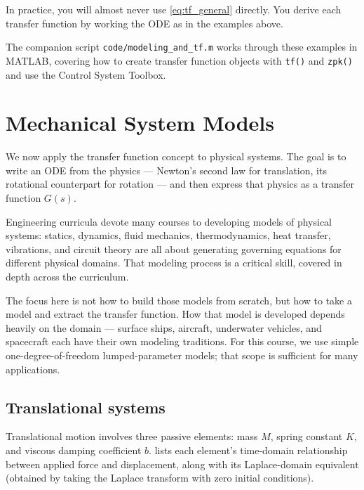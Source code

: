 \documentclass[12pt]{article}
\begin{document}
In practice, you will almost never use \cref{eq:tf_general} directly.  You
derive each transfer function by working the ODE as in the examples above.

The companion script \texttt{code/modeling\_and\_tf.m} works through these
examples in MATLAB, covering how to create transfer function objects with
\texttt{tf()} and \texttt{zpk()} and use the Control System Toolbox.

\section{Mechanical System Models}
\label{sec:mechanical}

We now apply the transfer function concept to physical systems.  The goal is
to write an ODE from the physics --- Newton's second law for translation,
its rotational counterpart for rotation --- and then express that physics as a transfer function $G(s)$.

Engineering curricula devote many courses to developing models of physical systems: statics, dynamics, fluid mechanics, thermodynamics, heat transfer, vibrations, and circuit theory are all about generating governing equations for different physical domains.  That modeling process is a critical skill, covered in depth across the curriculum.

The focus here is not how to build those models from scratch, but how to take a model and extract the transfer function.  How that model is developed depends heavily on the domain --- surface ships, aircraft, underwater vehicles, and spacecraft each have their own modeling traditions.  For this course, we use simple one-degree-of-freedom lumped-parameter models; that scope is sufficient for many applications.

\subsection{Translational systems}
\label{sec:translation}

Translational motion involves three passive elements: mass $M$, spring
constant $K$, and viscous damping coefficient $b$.  
lists each element's time-domain relationship between applied force and
displacement, along with its Laplace-domain equivalent (obtained by taking the
Laplace transform with zero initial conditions).
\end{document}
